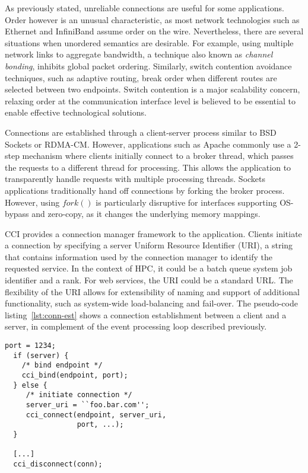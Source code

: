 As previously stated, unreliable connections are useful for some applications. 
Order however is an unusual characteristic, as most network technologies such 
as Ethernet and InfiniBand assume order on the wire. 
Nevertheless, there are several situations when unordered semantics are 
desirable. For example, using multiple network links to aggregate bandwidth, 
a technique also known as \emph{channel bonding}, inhibits global packet ordering. 
Similarly, switch contention avoidance techniques, 
such as adaptive routing, break order when different routes are selected 
between two endpoints. Switch contention is a major scalability concern, 
relaxing order at the communication interface level is believed to be 
essential to enable effective technological solutions.

Connections are established through a client-server process similar to 
BSD Sockets or RDMA-CM. However, applications such as 
Apache commonly use a 2-step mechanism where clients 
initially connect to a broker thread, which passes the requests to a 
different thread for processing. This allows the application to 
transparently handle requests with multiple processing threads. Sockets applications traditionally hand off connections by forking the broker process. However, using $fork()$ is particularly disruptive for interfaces supporting OS-bypass and zero-copy, as it changes the underlying memory mappings.

CCI provides a connection manager framework to 
the application. Clients initiate a connection by specifying a server 
Uniform Resource Identifier (URI), a string that contains information used 
by the connection manager to identify the requested service. In the context of 
HPC, it could be a batch queue system job identifier and a rank. For web 
services, the URI could be a standard URL. The flexibility of the URI allows 
for extensibility of naming and support of additional functionality, such as 
system-wide load-balancing and fail-over. The pseudo-code listing~\ref{lst:conn-est} shows a connection establishment between a client and a server, in complement of the event processing loop described previously.

\begin{lstlisting}[label=lst:conn-est,caption=CCI connection establishment example]
  port = 1234;
  if (server) {
    /* bind endpoint */
    cci_bind(endpoint, port);
  } else {
     /* initiate connection */
     server_uri = ``foo.bar.com'';
     cci_connect(endpoint, server_uri, 
                 port, ...);
  }

  [...]
  cci_disconnect(conn);
\end{lstlisting}

